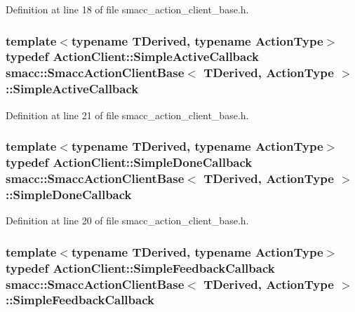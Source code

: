 Definition at line 18 of file smacc\+\_\+action\+\_\+client\+\_\+base.\+h.

\subsubsection[{\texorpdfstring{Simple\+Active\+Callback}{SimpleActiveCallback}}]{\setlength{\rightskip}{0pt plus 5cm}template$<$typename T\+Derived, typename Action\+Type$>$ typedef Action\+Client\+::\+Simple\+Active\+Callback {\bf smacc\+::\+Smacc\+Action\+Client\+Base}$<$ T\+Derived, Action\+Type $>$\+::{\bf Simple\+Active\+Callback}}\hypertarget{classsmacc_1_1SmaccActionClientBase_ae5aaa9660a758a113f72359a5cf3884e}{}\label{classsmacc_1_1SmaccActionClientBase_ae5aaa9660a758a113f72359a5cf3884e}


Definition at line 21 of file smacc\+\_\+action\+\_\+client\+\_\+base.\+h.

\subsubsection[{\texorpdfstring{Simple\+Done\+Callback}{SimpleDoneCallback}}]{\setlength{\rightskip}{0pt plus 5cm}template$<$typename T\+Derived, typename Action\+Type$>$ typedef Action\+Client\+::\+Simple\+Done\+Callback {\bf smacc\+::\+Smacc\+Action\+Client\+Base}$<$ T\+Derived, Action\+Type $>$\+::{\bf Simple\+Done\+Callback}}\hypertarget{classsmacc_1_1SmaccActionClientBase_a2cad0a2256df0161c60af458161edbfb}{}\label{classsmacc_1_1SmaccActionClientBase_a2cad0a2256df0161c60af458161edbfb}


Definition at line 20 of file smacc\+\_\+action\+\_\+client\+\_\+base.\+h.

\subsubsection[{\texorpdfstring{Simple\+Feedback\+Callback}{SimpleFeedbackCallback}}]{\setlength{\rightskip}{0pt plus 5cm}template$<$typename T\+Derived, typename Action\+Type$>$ typedef Action\+Client\+::\+Simple\+Feedback\+Callback {\bf smacc\+::\+Smacc\+Action\+Client\+Base}$<$ T\+Derived, Action\+Type $>$\+::{\bf Simple\+Feedback\+Callback}}\hypertarget{classsmacc_1_1SmaccActionClientBase_a6be950ca9b2ba07005d50731ed7b5ff8}{}\label{classsmacc_1_1SmaccActionClientBase_a6be950ca9b2ba07005d50731ed7b5ff8}


